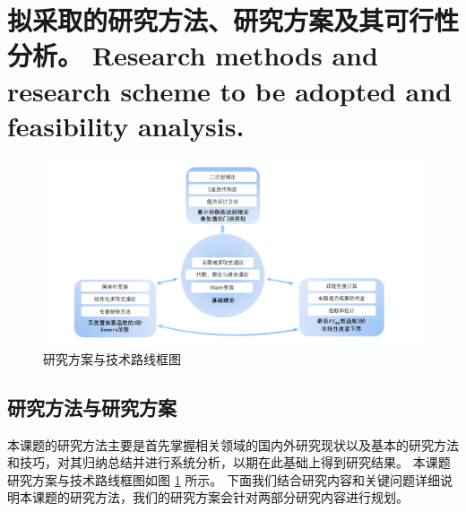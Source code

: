 \documentclass[a4paper,zihao=-4,AutoFakeBold]{ctexart}
\begin{document}
\section{拟采取的研究方法、研究方案及其可行性分析。
  Research methods and research scheme to be adopted
  and feasibility analysis.}
\begin{figure}
    \centering
    \includegraphics[width=17cm]{figures/Proposal_pic.png} 
    \caption{研究方案与技术路线框图}
    \label{pic:research_scheme}
\end{figure}
\subsection{研究方法与研究方案}
本课题的研究方法主要是首先掌握相关领域的国内外研究现状以及基本的研究方法和技巧，对其归纳总结并进行系统分析，以期在此基础上得到研究结果。
本课题研究方案与技术路线框图如图 \ref{pic:research_scheme} 所示。
下面我们结合研究内容和关键问题详细说明本课题的研究方法，我们的研究方案会针对两部分研究内容进行规划。
\end{document}
